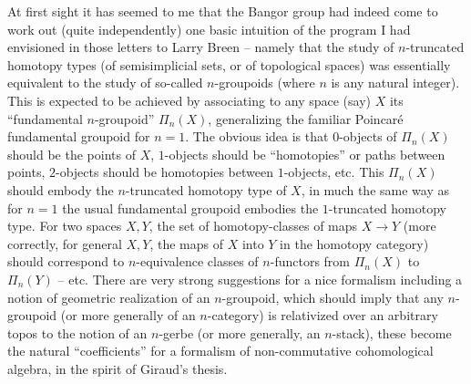 At first sight it has seemed to me that the Bangor group had indeed
come to work out (quite independently) one basic intuition of the
program I had envisioned in those letters to Larry Breen -- namely
that the study of $n$-truncated homotopy types (of semisimplicial
sets, or of topological spaces) was essentially equivalent to the
study of so-called $n$-groupoids (where $n$ is any natural
integer). This is expected to be achieved by associating to any space
(say) $X$ its ``fundamental $n$-groupoid'' $\Pi_n(X)$, generalizing
the familiar Poincar\'e fundamental groupoid for $n=1$. The obvious
idea is that $0$-objects of $\Pi_n(X)$ should be the points of $X$,
$1$-objects should be ``homotopies'' or paths between points,
$2$-objects should be homotopies between $1$-objects, etc. This
$\Pi_n(X)$ should embody the $n$-truncated homotopy type of $X$, in
much the same way as for $n=1$ the usual fundamental groupoid embodies
the $1$-truncated homotopy type. For two spaces $X,Y$, the set of
homotopy-classes of maps $X\to Y$ (more correctly, for general $X,Y$,
the maps of $X$ into $Y$ in the homotopy category) should correspond
to $n$-equivalence classes of $n$-functors from $\Pi_n(X)$ to
$\Pi_n(Y)$ -- etc. There are very strong suggestions for a nice
formalism including a notion of geometric realization of an
$n$-groupoid, which should imply that any $n$-groupoid (or more
generally of an $n$-category) is relativized over an arbitrary topos
to the notion of an $n$-gerbe (or more generally, an $n$-stack), these
become the natural ``coefficients'' for a formalism of non-commutative
cohomological algebra, in the spirit of Giraud's thesis.

